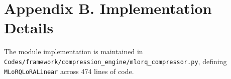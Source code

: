 \section*{Appendix B. Implementation Details}
The module implementation is maintained in \texttt{Codes/framework/compression\_engine/mlorq\_compressor.py}, defining \texttt{MLoRQLoRALinear} across 474 lines of code.
